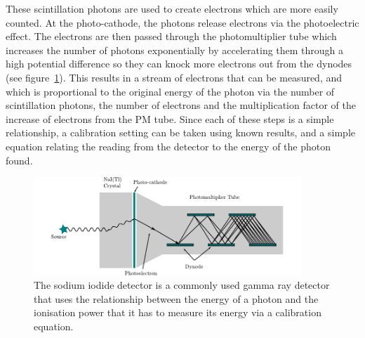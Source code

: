 These scintillation photons are used to create electrons which are more easily counted. At the photo-cathode, the photons release electrons via the photoelectric effect. The electrons are then passed through the photomultiplier tube which increases the number of photons exponentially by accelerating them through a high potential difference so they can knock more electrons out from the dynodes (see figure~\ref{fig:naidetctor})\cite{krane}. This results in a stream of electrons that can be measured, and which is proportional to the original energy of the photon via the number of scintillation photons, the number of electrons and the multiplication factor of the increase of electrons from the PM tube. Since each of these steps is a simple relationship, a calibration setting can be taken using known results, and a simple equation relating the reading from the detector to the energy of the photon found.
\begin{figure}[ht]
	\centering
	\includegraphics[width=0.9\textwidth]{NaIdetector.pdf}
	\caption{The sodium iodide detector is a commonly used gamma ray detector that uses the relationship between the energy of a photon and the ionisation power that it has to measure its energy via a calibration equation.\label{fig:naidetctor}}
\end{figure}

